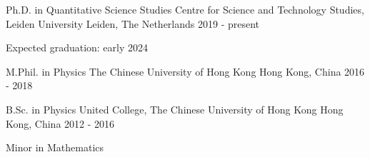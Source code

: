 

\begin{cventries}

  \cventry
    {Ph.D. in Quantitative Science Studies} %
    {Centre for Science and Technology Studies, Leiden University} %
    {Leiden, The Netherlands} %
    {2019 - present} %
    {
      \begin{cvitems} %
        \item {Expected graduation: early 2024}
      \end{cvitems}
    }

  \cventry
    {M.Phil. in Physics} %
    {The Chinese University of Hong Kong} %
    {Hong Kong, China} %
    {2016 - 2018} %
    {}

  \cventry
    {B.Sc. in Physics} %
    {United College, The Chinese University of Hong Kong} %
    {Hong Kong, China} %
    {2012 - 2016} %
    {
      \begin{cvitems} %
        \item {Minor in Mathematics}
      \end{cvitems}
    }

\end{cventries}
